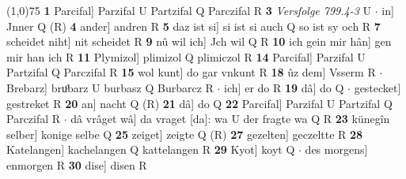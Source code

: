 \documentclass[8pt,a4paper,notitlepage]{article}
\begin{document}
\begin{table}[ht]
\begin{minipage}[t]{0.5\linewidth}
\line(1,0){75} \newline
\textbf{1} Parcifal] Parzifal U Partzifal Q Parczifal R \textbf{3} \textit{Versfolge 799.4-3} U   $\cdot$ in] Jnner Q (R) \textbf{4} ander] andren R \textbf{5} daz ist si] si ist si auch Q so ist sy och R \textbf{7} scheidet niht] nit scheidet R \textbf{9} nû wil ich] Jch wil Q R \textbf{10} ich gein mir hân] gen mir han ich R \textbf{11} Plymizol] plimizol Q plimiczol R \textbf{14} Parcifal] Parzifal U Partzifal Q Parczifal R \textbf{15} wol kunt] do gar vnkunt R \textbf{18} ûz dem] Vsserm R  $\cdot$ Brebarz] bruͦbarz U burbasz Q Burbarcz R  $\cdot$ ich] er do R \textbf{19} dâ] do Q  $\cdot$ gestecket] gestreket R \textbf{20} an] nacht Q (R) \textbf{21} dâ] do Q \textbf{22} Parcifal] Parzifal U Partzifal Q Parczifal R  $\cdot$ dâ vrâget wâ] da vraget [da]: wa U der fragte wa Q R \textbf{23} künegîn selber] konige selbe Q \textbf{25} zeiget] zeigte Q (R) \textbf{27} gezelten] geczeltte R \textbf{28} Katelangen] kachelangen Q kattelangen R \textbf{29} Kyot] koyt Q  $\cdot$ des morgens] enmorgen R \textbf{30} dise] disen R \newline
\end{minipage}
\end{table}
\end{document}
